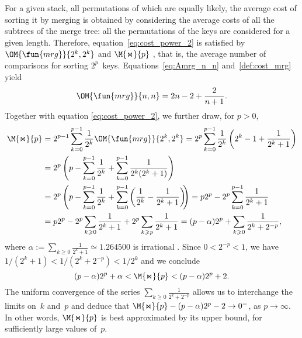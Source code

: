 For a given stack, all permutations of which are equally likely, the
average cost of sorting it by merging is obtained by considering the
average costs of all the subtrees of the merge tree: all the
permutations of the keys are considered for a given length. Therefore,
equation~\eqref{eq:cost_power_2} is satisfied by
\(\OM{\fun{mrg}}{2^k,2^k}\) and \(\M{\Join}{p}\)
, that is, the average number of comparisons
for sorting \(2^p\)~keys. Equations~\eqref{eq:Amrg_n_n}
and~\eqref{def:cost_mrg} yield
\begin{equation*}
\OM{\fun{mrg}}{n,n} = 2n - 2 + \frac{2}{n+1}.
\index{mrg@$\OM{\fun{mrg}}{n,n}$}
\end{equation*}
Together with equation \eqref{eq:cost_power_2}, we further draw, for
\(p > 0\),
\begin{align}
\abovedisplayskip=0pt
\belowdisplayskip=0pt
\M{\Join}{p}
  &= 2^{p-1}\sum_{k=0}^{p-1}{\frac{1}{2^k}\OM{\fun{mrg}}{2^k,2^k}}
  = 2^p\sum_{k=0}^{p-1}{\frac{1}{2^k}\left(2^k - 1 + \frac{1}{2^k +
      1}\right)}\notag\\
  &= 2^{p}\left(p - \sum_{k=0}^{p-1}{\frac{1}{2^k}}
     + \sum_{k=0}^{p-1}{\frac{1}{2^k(2^k+1)}}\right)\notag\\
  &= 2^{p}\left(p - \sum_{k=0}^{p-1}{\frac{1}{2^k}}
     + \sum_{k=0}^{p-1}\left(\frac{1}{2^k}
     - \frac{1}{2^k+1}\right)\!\!\right)
   = p2^p - 2^p \sum_{k=0}^{p-1}\frac{1}{2^k+1}\notag\\
  &= p2^p - 2^p \sum_{k \geqslant 0}\frac{1}{2^k+1}
     + 2^p \sum_{k \geqslant p}\frac{1}{2^k+1}
= (p - \alpha) 2^p + \sum_{k \geqslant 0}\frac{1}{2^{k}+2^{-p}},
\label{eq:Mjoin}
\end{align}
where \(\alpha := \sum_{k \geqslant 0}\frac{1}{2^k+1} \simeq
1.264500\) is irrational \citep{Borwein_1992}. Since \(0 < 2^{-p} <
1\), we have \(1/(2^k + 1) < 1/(2^k+2^{-p}) < 1/2^k\) and we conclude
\begin{equation}
(p - \alpha)2^p + \alpha < \M{\Join}{p} < (p-\alpha)2^p + 2.
\label{ineq:M_join}
\end{equation}
The uniform convergence of the series \(\sum_{k \geqslant
  0}\frac{1}{2^{k}+2^{-p}}\) allows us to interchange the limits
on~\(k\) and~\(p\) and deduce that \(\M{\Join}{p} - (p-\alpha)2^p - 2
\to 0^{-}\), as \(p \to \infty\). In other words,
\(\M{\Join}{p}\) is best approximated by its upper bound, for
sufficiently large values of~\(p\).

